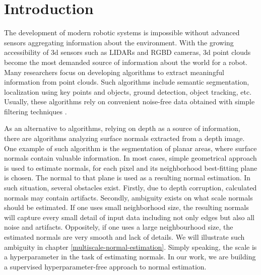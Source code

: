 \chapter{Introduction}

The development of modern robotic systems is impossible without advanced sensors aggregating information about the environment. With the growing accessibility of 3d sensors such as LIDARs and RGBD cameras, 3d point clouds become the most demanded source of information about the world for a robot. Many researchers focus on developing algorithms to extract meaningful information from point clouds. Such algorithms include semantic segmentation, localization using key points and objects, ground detection, object tracking, etc. Usually, these algorithms rely on convenient noise-free data obtained with simple filtering techniques \cite{dense_planar_slam}.

As an alternative to algorithms, relying on depth as a source of information, there are algorithms analyzing surface normals extracted from a depth image. One example of such algorithm is the segmentation of planar areas, where surface normals contain valuable information. In most cases, simple geometrical approach is used to estimate normals, for each pixel and its neighborhood best-fitting plane is chosen. The normal to that plane is used as a resulting normal estimation.  In such situation, several obstacles exist. Firstly, due to depth corruption, calculated normals may contain artifacts. Secondly, ambiguity exists on what scale normals should be estimated. If one uses small neighborhood size, the resulting normals will capture every small detail of input data including not only edges but also all noise and artifacts. Oppositely, if one uses a large neighbourhood size, the estimated normals are very smooth and lack of details. We will illustrate such ambiguity in chapter \ref{multiscale-normal-estimation}. Simply speaking, the scale is a hyperparameter in the task of estimating normals. In our work, we are building a supervised hyperparameter-free approach to normal estimation.

